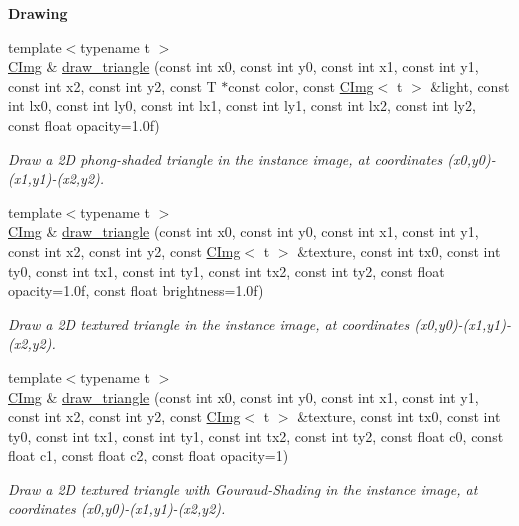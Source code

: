 \begin{Indent}{\bf Drawing}
\begin{DoxyCompactItemize}
{\footnotesize template$<$typename t $>$ }\\\hyperlink{structcimg__library_1_1_c_img}{CImg} \& \hyperlink{structcimg__library_1_1_c_img_af86fd54d8026484890548a67e4874962}{draw\_\-triangle} (const int x0, const int y0, const int x1, const int y1, const int x2, const int y2, const T $\ast$const color, const \hyperlink{structcimg__library_1_1_c_img}{CImg}$<$ t $>$ \&light, const int lx0, const int ly0, const int lx1, const int ly1, const int lx2, const int ly2, const float opacity=1.0f)
\begin{DoxyCompactList}\small\item\em Draw a 2D phong-\/shaded triangle in the instance image, at coordinates ({\ttfamily x0},{\ttfamily y0})-\/({\ttfamily x1},{\ttfamily y1})-\/({\ttfamily x2},{\ttfamily y2}). \item\end{DoxyCompactList}\item 
{\footnotesize template$<$typename t $>$ }\\\hyperlink{structcimg__library_1_1_c_img}{CImg} \& \hyperlink{structcimg__library_1_1_c_img_a88b0fa9ad8ff309f6a207acefcd37daa}{draw\_\-triangle} (const int x0, const int y0, const int x1, const int y1, const int x2, const int y2, const \hyperlink{structcimg__library_1_1_c_img}{CImg}$<$ t $>$ \&texture, const int tx0, const int ty0, const int tx1, const int ty1, const int tx2, const int ty2, const float opacity=1.0f, const float brightness=1.0f)
\begin{DoxyCompactList}\small\item\em Draw a 2D textured triangle in the instance image, at coordinates ({\ttfamily x0},{\ttfamily y0})-\/({\ttfamily x1},{\ttfamily y1})-\/({\ttfamily x2},{\ttfamily y2}). \item\end{DoxyCompactList}\item 
{\footnotesize template$<$typename t $>$ }\\\hyperlink{structcimg__library_1_1_c_img}{CImg} \& \hyperlink{structcimg__library_1_1_c_img_ac4ae8bf1d739c660374e3aa53215eed8}{draw\_\-triangle} (const int x0, const int y0, const int x1, const int y1, const int x2, const int y2, const \hyperlink{structcimg__library_1_1_c_img}{CImg}$<$ t $>$ \&texture, const int tx0, const int ty0, const int tx1, const int ty1, const int tx2, const int ty2, const float c0, const float c1, const float c2, const float opacity=1)
\begin{DoxyCompactList}\small\item\em Draw a 2D textured triangle with Gouraud-\/Shading in the instance image, at coordinates ({\ttfamily x0},{\ttfamily y0})-\/({\ttfamily x1},{\ttfamily y1})-\/({\ttfamily x2},{\ttfamily y2}). \item\end{DoxyCompactList}\item 

\end{DoxyCompactItemize}
\end{Indent}
